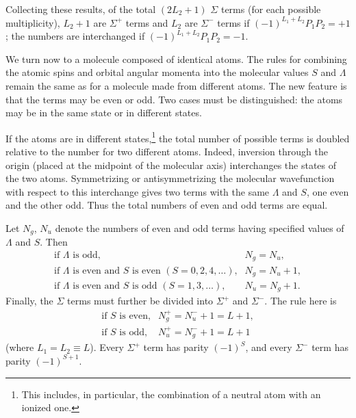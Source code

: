 Collecting these results, of the total $(2L_2+1)$ $\Sigma$ terms (for each possible multiplicity), $L_2+1$ are $\Sigma^+$ terms and $L_2$ are $\Sigma^-$ terms if $(-1)^{L_1+L_2}P_1P_2=+1$; the numbers are interchanged if $(-1)^{L_1+L_2}P_1P_2=-1$.

We turn now to a molecule composed of identical atoms. The rules for combining the atomic spins and orbital angular momenta into the molecular values $S$ and $\Lambda$ remain the same as for a molecule made from different atoms. The new feature is that the terms may be even or odd. Two cases must be distinguished: the atoms may be in the same state or in different states.

If the atoms are in different states,\footnote{This includes, in particular, the combination of a neutral atom with an ionized one.} the total number of possible terms is doubled relative to the number for two different atoms. Indeed, inversion through the origin (placed at the midpoint of the molecular axis) interchanges the states of the two atoms. Symmetrizing or antisymmetrizing the molecular wavefunction with respect to this interchange gives two terms with the same $\Lambda$ and $S$, one even and the other odd. Thus the total numbers of even and odd terms are equal.



Let $N_g$, $N_u$ denote the numbers of even and odd terms having specified values of $\Lambda$ and $S$. Then
\[
\begin{array}{ll}
\text{if $\Lambda$ is odd,}&N_g=N_u,\\
\text{if $\Lambda$ is even and $S$ is even $(S=0,2,4,\ldots)$,}&N_g=N_u+1,\\
\text{if $\Lambda$ is even and $S$ is odd $(S=1,3,\ldots)$,}&N_u=N_g+1.
\end{array}
\]
Finally, the $\Sigma$ terms must further be divided into $\Sigma^+$ and $\Sigma^-$. The rule here is
\[
\begin{array}{ll}
\text{if $S$ is even,}&N_g^+=N_u^-+1=L+1,\\
\text{if $S$ is odd,}&N_u^+=N_g^-+1=L+1
\end{array}
\]
(where $L_1=L_2\equiv L$). Every $\Sigma^+$ term has parity $(-1)^S$, and every $\Sigma^-$ term has parity $(-1)^{S+1}$.

